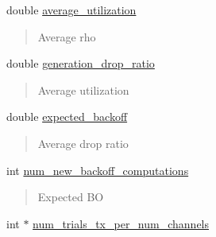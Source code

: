 \begin{DoxyCompactItemize}
double \hyperlink{structPerformance_adaea5a5d4981593333e8954c937a4434}{average\+\_\+utilization}
\begin{DoxyCompactList}\small\item\em \begin{quote}
Average rho \end{quote}
\end{DoxyCompactList}\item 
\mbox{\label{structPerformance_a82509648ab7ab5b0e195f671be9001a3}} 
double \hyperlink{structPerformance_a82509648ab7ab5b0e195f671be9001a3}{generation\+\_\+drop\+\_\+ratio}
\begin{DoxyCompactList}\small\item\em \begin{quote}
Average utilization \end{quote}
\end{DoxyCompactList}\item 
\mbox{\label{structPerformance_a8557816bbadeda8077ebaf1622560e6b}} 
double \hyperlink{structPerformance_a8557816bbadeda8077ebaf1622560e6b}{expected\+\_\+backoff}
\begin{DoxyCompactList}\small\item\em \begin{quote}
Average drop ratio \end{quote}
\end{DoxyCompactList}\item 
\mbox{\label{structPerformance_adcbc911a8cb8dbcbdd56843aa736cf68}} 
int \hyperlink{structPerformance_adcbc911a8cb8dbcbdd56843aa736cf68}{num\+\_\+new\+\_\+backoff\+\_\+computations}
\begin{DoxyCompactList}\small\item\em \begin{quote}
Expected BO \end{quote}
\end{DoxyCompactList}\item 
\mbox{\label{structPerformance_ae51e39428cd09575e24782ae3d83e40a}} 
int $\ast$ \hyperlink{structPerformance_ae51e39428cd09575e24782ae3d83e40a}{num\+\_\+trials\+\_\+tx\+\_\+per\+\_\+num\+\_\+channels}
\begin{DoxyCompactList}\small\item\em \begin{quote}

\end{quote}
\end{DoxyCompactList}
\end{DoxyCompactItemize}
